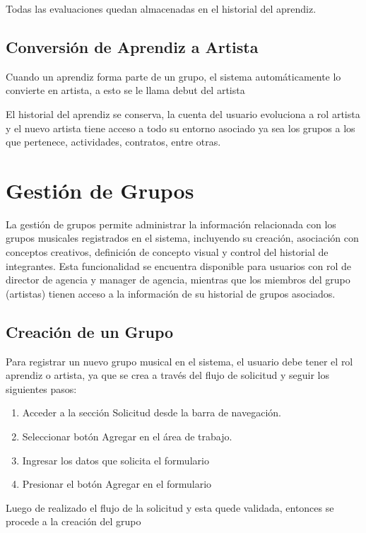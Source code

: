 \documentclass[12pt,a4paper,spanish,oneside]{article}
\begin{document}
	Todas las evaluaciones quedan almacenadas en el historial del aprendiz.
	
	\subsection{Conversión de Aprendiz a Artista}
	
	Cuando un aprendiz forma parte de un grupo, el sistema automáticamente lo convierte en artista, a esto se le llama debut del artista
	
	El historial del aprendiz se conserva, la cuenta del usuario evoluciona a rol artista y el nuevo artista tiene acceso a todo su entorno asociado ya sea los grupos a los que pertenece, actividades, contratos, entre otras.
	
	\section{Gestión de Grupos}
	
	La gestión de grupos permite administrar la información relacionada con los grupos musicales registrados en el sistema, incluyendo su creación, asociación con conceptos creativos, definición de concepto visual y control del historial de integrantes. Esta funcionalidad se encuentra disponible para usuarios con rol de director de agencia y manager de agencia, mientras que los miembros del grupo (artistas) tienen acceso a la información de su historial de grupos asociados.
	
	\subsection{Creación de un Grupo}
	
	Para registrar un nuevo grupo musical en el sistema, el usuario debe tener el rol aprendiz o artista, ya que se crea a través del flujo de solicitud y seguir los siguientes pasos:
	
	\begin{enumerate}
		\item Acceder a la sección Solicitud desde la barra de navegación.
		\item Seleccionar botón Agregar en el área de trabajo.
		\item Ingresar los datos que solicita el formulario
		\item Presionar el botón Agregar en el formulario
	\end{enumerate}
	
	Luego de realizado el flujo de la solicitud y esta quede validada, entonces se procede a la creación del grupo
	
\end{document}
